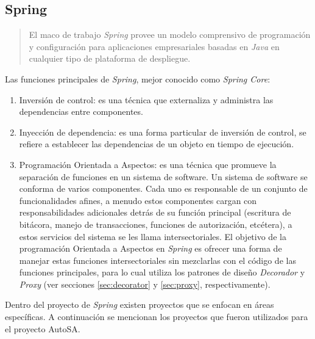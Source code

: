 \subsection{Spring}\label{sec:spring}
\begin{quote}
	El maco de trabajo \textit{Spring} provee un modelo comprensivo de programación y configuración para aplicaciones empresariales basadas en \textit{Java} en cualquier tipo de plataforma de despliegue\cite{SpringFramework}.
\end{quote}

Las funciones principales de \textit{Spring}, mejor conocido como \textit{Spring Core}\cite{Spring5DesignPatterns, ProSpring5, WellGroundedJavaDeveloper, SpringInAction}:
\begin{enumerate}
	\item Inversión de control: es una técnica que externaliza y administra las dependencias entre componentes.

	\item Inyección de dependencia: es una forma particular de inversión de control, se refiere a establecer las dependencias de un objeto en tiempo de ejecución.

	\item Programación Orientada a Aspectos: es una técnica que promueve la separación de funciones en un sistema de software. Un sistema de software se conforma de varios componentes. Cada uno es responsable de un conjunto de funcionalidades afines, a menudo estos componentes cargan con responsabilidades adicionales detrás de su función principal (escritura de bitácora, manejo de transacciones, funciones de autorización, etcétera), a estos servicios del sistema se les llama intersectoriales. El objetivo de la programación Orientada a Aspectos en \textit{Spring}  es ofrecer una forma de manejar estas funciones intersectoriales sin mezclarlas con el código de las funciones principales, para lo cual utiliza los patrones de diseño \textit{Decorador} y \textit{Proxy} (ver secciones \ref{sec:decorator} y \ref{sec:proxy}, respectivamente).
\end{enumerate}

Dentro del proyecto de \textit{Spring} existen proyectos que se enfocan en áreas específicas. A continuación se mencionan los proyectos que fueron utilizados para el proyecto AutoSA.


